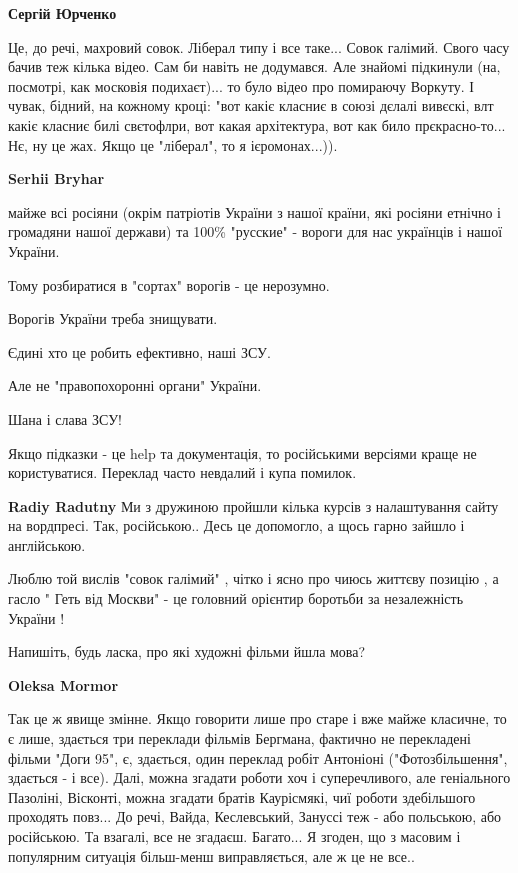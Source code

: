 \begin{itemize}
\begin{itemize} %
\textbf{Сергій Юрченко} 

Це, до речі, махровий совок. Ліберал типу і все таке... Совок галімий. Свого
часу бачив теж кілька відео. Сам би навіть не додумався. Але знайомі підкинули
(на, посмотрі, как московія подихаєт)... то було відео про помираючу Воркуту. І
чувак, бідний, на кожному кроці: "вот какіє класниє в союзі дєлалі вивєскі, влт
какіє класниє билі свєтофлри, вот какая архітектура, вот как било
прєкрасно-то... Нє, ну це жах. Якщо це "ліберал", то я ієромонах...)).

\textbf{Serhii Bryhar} 

майже всі росіяни (окрім патріотів України з нашої країни, які росіяни етнічно
і громадяни нашої держави) та 100\% "русские" - вороги для нас українців і
нашої України.

Тому розбиратися в "сортах" ворогів - це нерозумно.

Ворогів України треба знищувати.

Єдині хто це робить ефективно, наші ЗСУ.

Але не "правопохоронні органи" України.

Шана і слава ЗСУ!
\end{itemize} %


Якщо підказки - це help та документація, то російськими версіями краще не
користуватися. Переклад часто невдалий і купа помилок.

\begin{itemize} %
\textbf{Radiy Radutny} Ми з дружиною пройшли кілька курсів з налаштування сайту на вордпресі. Так, російською.. Десь це допомогло, а щось гарно зайшло і англійською.
\end{itemize} %


Люблю той вислів "совок галімий" , чітко і ясно про чиюсь життєву позицію , а
гасло " Геть від Москви" - це головний орієнтир боротьби за незалежність
України !

Напишіть, будь ласка, про які художні фільми йшла мова?

\begin{itemize} %
\textbf{Oleksa Mormor} 

Так це ж явище змінне. Якщо говорити лише про старе і вже майже класичне, то є
лише, здається три переклади фільмів Бергмана, фактично не перекладені фільми
"Доги 95", є, здається, один переклад робіт Антоніоні ("Фотозбільшення",
здається - і все). Далі, можна згадати роботи хоч і суперечливого, але
геніального Пазоліні, Вісконті, можна згадати братів Каурісмякі, чиї роботи
здебільшого проходять повз... До речі, Вайда, Кеслевський, Зануссі теж - або
польською, або російською. Та взагалі, все не згадаєш. Багато... Я згоден, що з
масовим і популярним ситуація більш-менш виправляється, але ж це не все..


\end{itemize}
\end{itemize}
